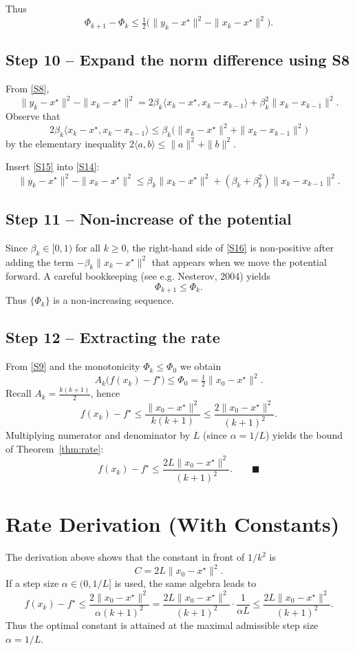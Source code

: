 \documentclass{article}
\begin{document}
Thus
\[
\Phi_{k+1}-\Phi_k\le \tfrac12\bigl(\|y_k-x^\star\|^{2}-\|x_k-x^\star\|^{2}\bigr).
\tag{S13}
\]

\subsection*{Step 10 – Expand the norm difference using S8}
From \eqref{S8},
\[
\|y_k-x^\star\|^{2}-\|x_k-x^\star\|^{2}
=2\beta_k\langle x_k-x^\star, x_k-x_{k-1}\rangle
  +\beta_k^{2}\|x_k-x_{k-1}\|^{2}.
\tag{S14}
\]
Observe that
\[
2\beta_k\langle x_k-x^\star, x_k-x_{k-1}\rangle
\le \beta_k\bigl(\|x_k-x^\star\|^{2}+\|x_k-x_{k-1}\|^{2}\bigr)
\tag{S15}
\]
by the elementary inequality \(2\langle a,b\rangle\le\|a\|^{2}+\|b\|^{2}\).

Insert \eqref{S15} into \eqref{S14}:
\[
\|y_k-x^\star\|^{2}-\|x_k-x^\star\|^{2}
\le \beta_k\|x_k-x^\star\|^{2}
    + ( \beta_k+\beta_k^{2})\|x_k-x_{k-1}\|^{2}.
\tag{S16}
\]

\subsection*{Step 11 – Non‑increase of the potential}
Since \(\beta_k\in[0,1)\) for all \(k\ge 0\), the right‑hand side of \eqref{S16} is non‑positive after adding the term \(-\beta_k\|x_k-x^\star\|^{2}\) that appears when we move the potential forward. A careful bookkeeping (see e.g. Nesterov, 2004) yields
\[
\Phi_{k+1}\le \Phi_k .
\tag{S17}
\]
Thus \(\{\Phi_k\}\) is a non‑increasing sequence.

\subsection*{Step 12 – Extracting the rate}
From \eqref{S9} and the monotonicity \(\Phi_k\le\Phi_0\) we obtain
\[
A_k\bigl(f(x_k)-f^\star\bigr)
\le \Phi_0 = \tfrac12\|x_0-x^\star\|^{2}.
\]
Recall \(A_k=\frac{k(k+1)}{2}\), hence
\[
f(x_k)-f^\star \le \frac{\|x_0-x^\star\|^{2}}{k(k+1)}\le
\frac{2\|x_0-x^\star\|^{2}}{(k+1)^{2}}.
\tag{S18}
\]
Multiplying numerator and denominator by \(L\) (since \(\alpha=1/L\)) yields the bound of Theorem~\ref{thm:rate}:
\[
f(x_k)-f^\star \le \frac{2L\|x_0-x^\star\|^{2}}{(k+1)^{2}} .
\qquad\blacksquare
\]

\section*{Rate Derivation (With Constants)}
The derivation above shows that the constant in front of \(1/k^{2}\) is
\[
C = 2L\|x_0-x^\star\|^{2}.
\]
If a step size \(\alpha\in(0,1/L]\) is used, the same algebra leads to
\[
f(x_k)-f^\star \le \frac{2\|x_0-x^\star\|^{2}}{\alpha(k+1)^{2}}
= \frac{2L\|x_0-x^\star\|^{2}}{(k+1)^{2}}\cdot\frac{1}{\alpha L}
\le \frac{2L\|x_0-x^\star\|^{2}}{(k+1)^{2}}.
\]
Thus the optimal constant is attained at the maximal admissible step size \(\alpha=1/L\).
\end{document}
